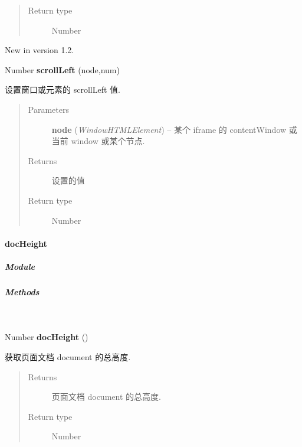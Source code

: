 \documentclass[letterpaper,10pt,english]{sphinxmanual}
\begin{document}
\begin{fulllineitems}
\begin{quote}
\begin{description}
\item[{Return type}] \leavevmode
Number

\end{description}\end{quote}
New in version 1.2.
\begin{DUlineblock}{0em}
\item[] Number \textbf{scrollLeft} (node,num)
\item[] 设置窗口或元素的 scrollLeft 值.
\end{DUlineblock}
\begin{quote}\begin{description}
\item[{Parameters}] \leavevmode
\textbf{node} (\emph{Window\textbar{}HTMLElement}) -- 某个 iframe 的 contentWindow 或当前 window 或某个节点.

\item[{Returns}] \leavevmode
设置的值

\item[{Return type}] \leavevmode
Number

\end{description}\end{quote}

\end{fulllineitems}



\paragraph{docHeight}
\label{api/core/dom/docHeight::doc}\label{api/core/dom/docHeight:docheight}

\subparagraph{Module}
\label{api/core/dom/docHeight:module}\begin{quote}

{\hyperref[api/core/dom/index:module-DOM]{}}
\end{quote}


\subparagraph{Methods}
\label{api/core/dom/docHeight:methods}

\begin{fulllineitems}
\label{api/core/dom/docHeight:DOM.docHeight}~
\begin{DUlineblock}{0em}
\item[] Number \textbf{docHeight} ()
\item[] 获取页面文档 document 的总高度.
\end{DUlineblock}
\begin{quote}\begin{description}
\item[{Returns}] \leavevmode
页面文档 document 的总高度.

\item[{Return type}] \leavevmode
Number

\end{description}\end{quote}

\end{fulllineitems}
\end{document}
